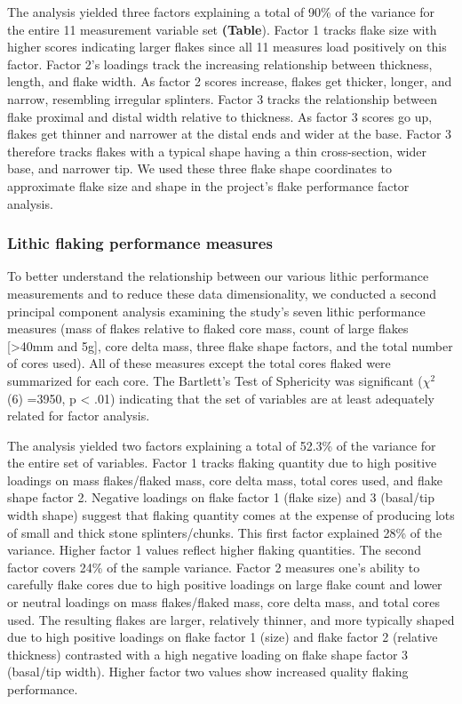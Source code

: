 \documentclass[smallextended]{svjour3}       %
\begin{document}
The analysis yielded three factors explaining a total of 90\% of the
variance for the entire 11 measurement variable set \textbf{(Table}).
Factor 1 tracks flake size with higher scores indicating larger flakes
since all 11 measures load positively on this factor. Factor 2's
loadings track the increasing relationship between thickness, length,
and flake width. As factor 2 scores increase, flakes get thicker,
longer, and narrow, resembling irregular splinters. Factor 3 tracks the
relationship between flake proximal and distal width relative to
thickness. As factor 3 scores go up, flakes get thinner and narrower at
the distal ends and wider at the base. Factor 3 therefore tracks flakes
with a typical shape having a thin cross-section, wider base, and
narrower tip. We used these three flake shape coordinates to approximate
flake size and shape in the project's flake performance factor analysis.

\hypertarget{lithic-flaking-performance-measures}{%
\subsubsection{\texorpdfstring{\textbf{Lithic flaking performance
measures}}{Lithic flaking performance measures}}\label{lithic-flaking-performance-measures}}

To better understand the relationship between our various lithic
performance measurements and to reduce these data dimensionality, we
conducted a second principal component analysis examining the study's
seven lithic performance measures (mass of flakes relative to flaked
core mass, count of large flakes {[}\textgreater40mm and 5g{]}, core
delta mass, three flake shape factors, and the total number of cores
used). All of these measures except the total cores flaked were
summarized for each core. The Bartlett's Test of Sphericity was
significant (\(\chi ^2\) (6) =3950, p \textless{} .01) indicating that
the set of variables are at least adequately related for factor
analysis.

The analysis yielded two factors explaining a total of 52.3\% of the
variance for the entire set of variables. Factor 1 tracks flaking
quantity due to high positive loadings on mass flakes/flaked mass, core
delta mass, total cores used, and flake shape factor 2. Negative
loadings on flake factor 1 (flake size) and 3 (basal/tip width shape)
suggest that flaking quantity comes at the expense of producing lots of
small and thick stone splinters/chunks. This first factor explained 28\%
of the variance. Higher factor 1 values reflect higher flaking
quantities. The second factor covers 24\% of the sample variance. Factor
2 measures one's ability to carefully flake cores due to high positive
loadings on large flake count and lower or neutral loadings on mass
flakes/flaked mass, core delta mass, and total cores used. The resulting
flakes are larger, relatively thinner, and more typically shaped due to
high positive loadings on flake factor 1 (size) and flake factor 2
(relative thickness) contrasted with a high negative loading on flake
shape factor 3 (basal/tip width). Higher factor two values show
increased quality flaking performance.
\end{document}
